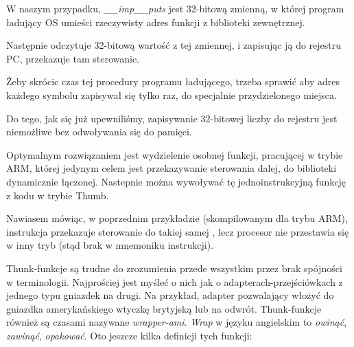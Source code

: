 W naszym przypadku, \emph{\_\_imp\_\_puts} jest 32-bitową zmienną, w której program ładujący \ac{OS} umieści rzeczywisty adres funkcji z biblioteki zewnętrznej.

Następnie  odczytuje 32-bitową wartość z tej zmiennej, i zapisując ją do rejestru \ac{PC}, przekazuje tam sterowanie.

Żeby skrócic czas tej procedury programu ładującego, trzeba sprawić aby adres każdego symbolu zapisywał się tylko raz, do specjalnie przydzielonego miejsca.

Do tego, jak się już upewniliśmy, zapisywanie 32-bitowej liczby do rejestru jest niemożliwe bez odwoływania się do pamięci.

Optymalnym rozwiązaniem jest wydzielenie osobnej funkcji, pracującej w trybie ARM,
której jedynym celem jest przekazywanie sterowania dalej, do biblioteki dynamicznie łączonej. Nastepnie można wywoływać tę jednoinstrukcyjną funkcję z kodu w trybie Thumb.

Nawiasem mówiąc, w poprzednim przykładzie (skompilowanym dla trybu ARM), instrukcja  przekazuje sterowanie do takiej samej , lecz procesor nie przestawia się w inny tryb (stąd brak  w mnemoniku instrukcji).


Thunk-funkcje są trudne do zrozumienia przede wszystkim przez brak spójności w terminologii.
Najprościej jest myśleć o nich jak o adapterach-przejściówkach z jednego typu gniazdek na drugi.
Na przykład, adapter pozwalający włożyć do gniazdka amerykańskiego wtyczkę brytyjską lub na odwrót. Thunk-funkcje również są czasami nazywane \emph{wrapper-ami}. \emph{Wrap} w języku angielskim to \emph{owinąć}, \emph{zawinąć}, \emph{opakować}.
Oto jeszcze kilka definicji tych funkcji:

